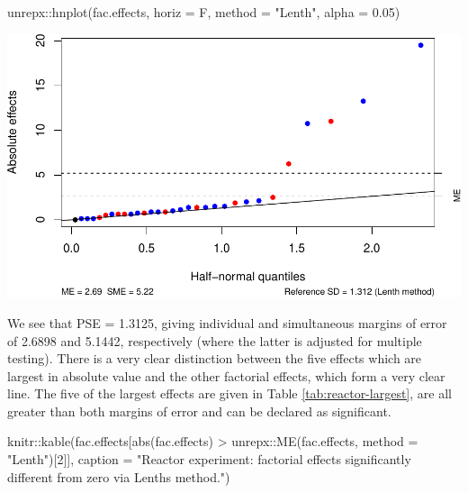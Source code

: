 \documentclass[
]{book}
\newenvironment{Shaded}{\begin{snugshade}}{\end{snugshade}}
\newcommand{\AttributeTok}[1]{\textcolor[rgb]{0.77,0.63,0.00}{#1}}
\newcommand{\DecValTok}[1]{\textcolor[rgb]{0.00,0.00,0.81}{#1}}
\newcommand{\FloatTok}[1]{\textcolor[rgb]{0.00,0.00,0.81}{#1}}
\newcommand{\FunctionTok}[1]{\textcolor[rgb]{0.00,0.00,0.00}{#1}}
\newcommand{\NormalTok}[1]{#1}
\newcommand{\SpecialCharTok}[1]{\textcolor[rgb]{0.00,0.00,0.00}{#1}}
\newcommand{\StringTok}[1]{\textcolor[rgb]{0.31,0.60,0.02}{#1}}
\theoremstyle{definition}
\theoremstyle{definition}
\theoremstyle{definition}
\theoremstyle{definition}
\theoremstyle{remark}
\begin{document}
\begin{Shaded}
\begin{Highlighting}[]
\NormalTok{unrepx}\SpecialCharTok{::}\FunctionTok{hnplot}\NormalTok{(fac.effects, }\AttributeTok{horiz =}\NormalTok{ F, }\AttributeTok{method =} \StringTok{"Lenth"}\NormalTok{, }\AttributeTok{alpha =} \FloatTok{0.05}\NormalTok{)}
\end{Highlighting}
\end{Shaded}

\includegraphics{bookdown_math3014-6027_files/figure-latex/reactor-lenth-1.pdf}

We see that PSE = 1.3125, giving individual and simultaneous margins of error of 2.6898 and 5.1442, respectively (where the latter is adjusted for multiple testing). There is a very clear distinction between the five effects which are largest in absolute value and the other factorial effects, which form a very clear line. The five of the largest effects are given in Table \ref{tab:reactor-largest}, are all greater than both margins of error and can be declared as significant.

\begin{Shaded}
\begin{Highlighting}[]
\NormalTok{knitr}\SpecialCharTok{::}\FunctionTok{kable}\NormalTok{(fac.effects[}\FunctionTok{abs}\NormalTok{(fac.effects) }\SpecialCharTok{\textgreater{}}\NormalTok{ unrepx}\SpecialCharTok{::}\FunctionTok{ME}\NormalTok{(fac.effects, }
                                                       \AttributeTok{method =} \StringTok{"Lenth"}\NormalTok{)[}\DecValTok{2}\NormalTok{]],}
             \AttributeTok{caption =} \StringTok{"Reactor experiment: factorial effects significantly different from zero via Lenth\textquotesingle{}s method."}\NormalTok{)}
\end{Highlighting}
\end{Shaded}
\end{document}
